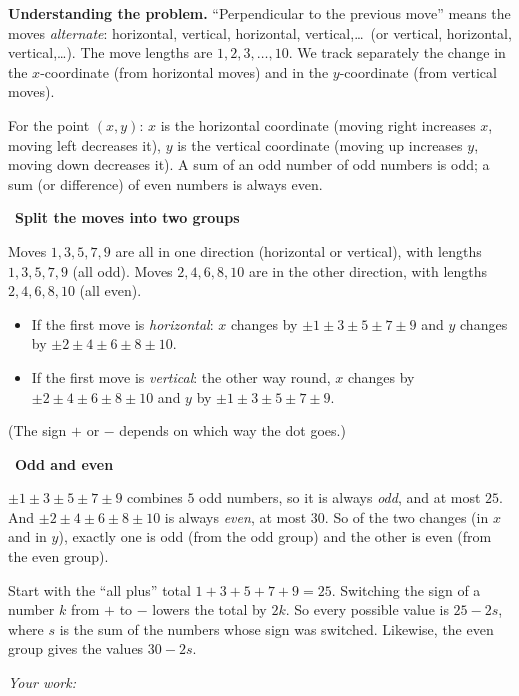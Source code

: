 \documentclass[11pt]{article}
\newif\ifsol \solfalse
\newcommand{\probsol}[1]{%
  \begin{lrbox}{\solmeasure}\begin{minipage}{\dimexpr\linewidth-24pt\relax}#1\end{minipage}\end{lrbox}%
  \ifsol
    \begin{solbox}#1\end{solbox}%
  \else
    \setlength{\solht}{\dimexpr\ht\solmeasure+\dp\solmeasure+0.85cm\relax}%
    \ifdim\solht<1.35cm\setlength{\solht}{1.35cm}\fi
    \ifdim\solht>\StudentMaxWork\setlength{\solht}{\StudentMaxWork}\fi
    \begin{tcolorbox}[colback=white,colframe=Line,boxrule=0.8pt,arc=5pt,
      left=8pt,right=8pt,top=4pt,bottom=4pt,height=\solht]{\footnotesize\color{Slate}\itshape\WorkWord}\end{tcolorbox}%
  \fi}
\newlength{\StudentMaxWork}\setlength{\StudentMaxWork}{7.5cm}
\newcommand{\step}[2]{\par\smallskip\noindent{\bfseries\color{tmBlue!85!black}\StepWord~#1.}\ {\bfseries #2}\par\nopagebreak}
\def\WorkWord{Your work:}
\def\StepWord{Step}
\begin{document}
\probsol{
\textbf{Understanding the problem.} ``Perpendicular to the previous move'' means the moves \emph{alternate}: horizontal, vertical, horizontal, vertical,\dots\ (or vertical, horizontal, vertical,\dots). The move lengths are $1,2,3,\dots,10$. We track separately the change in the $x$-coordinate (from horizontal moves) and in the $y$-coordinate (from vertical moves).

\begin{recallbox}For the point $(x,y)$: $x$ is the horizontal coordinate (moving right increases $x$, moving left decreases it), $y$ is the vertical coordinate (moving up increases $y$, moving down decreases it). A sum of an odd number of odd numbers is odd; a sum (or difference) of even numbers is always even.\end{recallbox}

\step{1}{Split the moves into two groups}
Moves $1,3,5,7,9$ are all in one direction (horizontal or vertical), with lengths $1,3,5,7,9$ (all odd). Moves $2,4,6,8,10$ are in the other direction, with lengths $2,4,6,8,10$ (all even).
\begin{itemize}[leftmargin=1.4em,itemsep=1pt]
\item If the first move is \emph{horizontal}: $x$ changes by $\pm1\pm3\pm5\pm7\pm9$ and $y$ changes by $\pm2\pm4\pm6\pm8\pm10$.
\item If the first move is \emph{vertical}: the other way round, $x$ changes by $\pm2\pm4\pm6\pm8\pm10$ and $y$ by $\pm1\pm3\pm5\pm7\pm9$.
\end{itemize}
(The sign $+$ or $-$ depends on which way the dot goes.)

\step{2}{Odd and even}
$\pm1\pm3\pm5\pm7\pm9$ combines $5$ odd numbers, so it is always \emph{odd}, and at most $25$. And $\pm2\pm4\pm6\pm8\pm10$ is always \emph{even}, at most $30$. So of the two changes (in $x$ and in $y$), exactly one is odd (from the odd group) and the other is even (from the even group).

\begin{proofbox}Start with the ``all plus'' total $1+3+5+7+9=25$. Switching the sign of a number $k$ from $+$ to $-$ lowers the total by $2k$. So every possible value is $25-2s$, where $s$ is the sum of the numbers whose sign was switched. Likewise, the even group gives the values $30-2s$.\end{proofbox}

}
\end{document}
